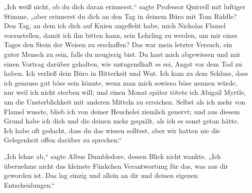 „Ich weiß nicht, ob du dich daran erinnerst,“ sagte Professor Quirrell mit luftiger Stimme, „aber erinnerst du dich an den Tag in deinem Büro mit Tom Riddle? Den Tag, an dem ich dich auf Knien angefleht habe, mich Nicholas Flamel vorzustellen, damit ich ihn bitten kann, sein Lehrling zu werden, um mir eines Tages den Stein der Weisen zu erschaffen? Das war mein letzter Versuch, ein guter Mensch zu sein, falls du neugierig bist. Du hast mich abgewiesen und mir einen Vortrag darüber gehalten, wie untugendhaft es sei, Angst vor dem Tod zu haben. Ich verließ dein Büro in Bitterkeit und Wut. Ich kam zu dem Schluss, dass ich genauso gut böse sein könnte, wenn man mich sowieso böse nennen würde, nur weil ich nicht sterben will; und einen Monat später tötete ich Abigail Myrtle, um die Unsterblichkeit mit anderen Mitteln zu erreichen. Selbst als ich mehr von Flamel wusste, blieb ich von deiner Heuchelei ziemlich genervt; und aus diesem Grund habe ich dich und die deinen mehr gequält, als ich es sonst getan hätte. Ich habe oft gedacht, dass du das wissen solltest, aber wir hatten nie die Gelegenheit offen darüber zu sprechen.“

„Ich lehne ab,“ sagte Albus Dumbledore, dessen Blick nicht wankte. „Ich übernehme nicht das kleinste Fünkchen Verantwortung für das, was aus dir geworden ist. Das lag einzig und allein an dir und deinen eigenen Entscheidungen.“

